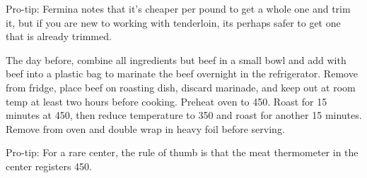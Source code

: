 \noindent Pro-tip: Fermina notes that it's cheaper per pound to get a whole one and trim it, but if you are new to working with  tenderloin, its perhaps safer to get one that is already trimmed.

The day before, combine all ingredients but beef in a small bowl and add with beef into a plastic bag to marinate the beef overnight in the refrigerator. Remove from fridge, place beef on roasting dish, discard marinade, and keep out at room temp at least two hours before cooking. Preheat oven to \SI{450}{\degreeF}. Roast for 15 minutes at \SI{450}{\degreeF}, then reduce temperature to 350 and roast for another 15 minutes. Remove from oven and double wrap in heavy foil before serving. 

\noindent Pro-tip: For a rare center, the rule of thumb is that the meat thermometer in the center registers \SI{450}{\degreeF}.